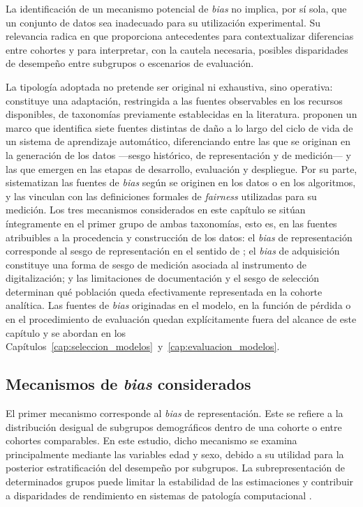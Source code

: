 La identificación de un mecanismo potencial de \textit{bias} no implica, por sí sola, que un conjunto de datos sea inadecuado para su utilización experimental. Su relevancia radica en que proporciona antecedentes para contextualizar diferencias entre cohortes y para interpretar, con la cautela necesaria, posibles disparidades de desempeño entre subgrupos o escenarios de evaluación.

La tipología adoptada no pretende ser original ni exhaustiva, sino operativa: constituye una adaptación, restringida a las fuentes observables en los recursos disponibles, de taxonomías previamente establecidas en la literatura. \textcite{suresh2021framework} proponen un marco que identifica siete fuentes distintas de daño a lo largo del ciclo de vida de un sistema de aprendizaje automático, diferenciando entre las que se originan en la generación de los datos —sesgo histórico, de representación y de medición— y las que emergen en las etapas de desarrollo, evaluación y despliegue. Por su parte, \textcite{mehrabi2021survey} sistematizan las fuentes de \textit{bias} según se originen en los datos o en los algoritmos, y las vinculan con las definiciones formales de \textit{fairness} utilizadas para su medición. Los tres mecanismos considerados en este capítulo se sitúan íntegramente en el primer grupo de ambas taxonomías, esto es, en las fuentes atribuibles a la procedencia y construcción de los datos: el \textit{bias} de representación corresponde al sesgo de representación en el sentido de \textcite{suresh2021framework}; el \textit{bias} de adquisición constituye una forma de sesgo de medición asociada al instrumento de digitalización; y las limitaciones de documentación y el sesgo de selección determinan qué población queda efectivamente representada en la cohorte analítica. Las fuentes de \textit{bias} originadas en el modelo, en la función de pérdida o en el procedimiento de evaluación quedan explícitamente fuera del alcance de este capítulo y se abordan en los Capítulos~\ref{cap:seleccion_modelos}~y~\ref{cap:evaluacion_modelos}.

\subsection{Mecanismos de \textit{bias} considerados}

El primer mecanismo corresponde al \textit{bias} de representación. Este se refiere a la distribución desigual de subgrupos demográficos dentro de una cohorte o entre cohortes comparables. En este estudio, dicho mecanismo se examina principalmente mediante las variables edad y sexo, debido a su utilidad para la posterior estratificación del desempeño por subgrupos. La subrepresentación de determinados grupos puede limitar la estabilidad de las estimaciones y contribuir a disparidades de rendimiento en sistemas de patología computacional \parencite{vaidya2024demographic}.

